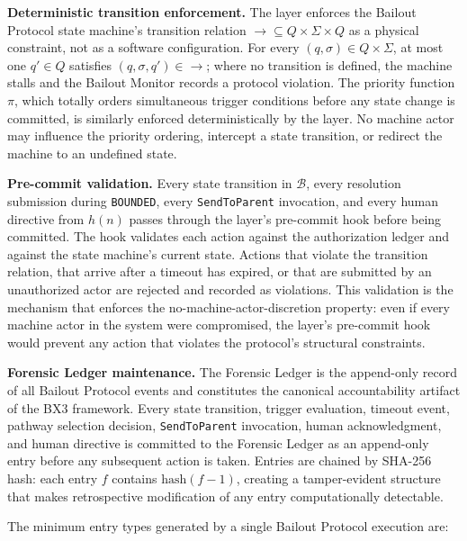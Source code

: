 \textbf{Deterministic transition enforcement.} The \fact{} layer enforces the Bailout Protocol state machine's transition relation $\rightarrow \subseteq Q \times \Sigma \times Q$ as a physical constraint, not as a software configuration. For every $(q, \sigma) \in Q \times \Sigma$, at most one $q' \in Q$ satisfies $(q, \sigma, q') \in \rightarrow$; where no transition is defined, the machine stalls and the Bailout Monitor records a protocol violation. The priority function $\pi$, which totally orders simultaneous trigger conditions before any state change is committed, is similarly enforced deterministically by the \fact{} layer. No machine actor may influence the priority ordering, intercept a state transition, or redirect the machine to an undefined state.

\textbf{Pre-commit validation.} Every state transition in $\mathcal{B}$, every resolution submission during \texttt{BOUNDED}, every \texttt{SendToParent} invocation, and every human directive from $h(n)$ passes through the \fact{} layer's pre-commit hook before being committed. The hook validates each action against the authorization ledger and against the state machine's current state. Actions that violate the transition relation, that arrive after a timeout has expired, or that are submitted by an unauthorized actor are rejected and recorded as violations. This validation is the mechanism that enforces the no-machine-actor-discretion property: even if every machine actor in the system were compromised, the \fact{} layer's pre-commit hook would prevent any action that violates the protocol's structural constraints.

\textbf{Forensic Ledger maintenance.} The Forensic Ledger is the append-only record of all Bailout Protocol events and constitutes the canonical accountability artifact of the BX3 framework. Every state transition, trigger evaluation, timeout event, pathway selection decision, \texttt{SendToParent} invocation, human acknowledgment, and human directive is committed to the Forensic Ledger as an append-only entry before any subsequent action is taken. Entries are chained by SHA-256 hash: each entry $f$ contains $\text{hash}(f-1)$, creating a tamper-evident structure that makes retrospective modification of any entry computationally detectable.

The minimum entry types generated by a single Bailout Protocol execution are:

